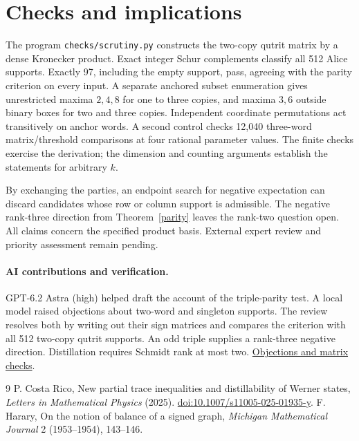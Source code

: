 \documentclass[11pt]{article}
\begin{document}
\section{Checks and implications}
The program \texttt{checks/scrutiny.py} constructs the two-copy qutrit matrix by a dense Kronecker product. Exact integer Schur complements classify all 512 Alice supports. Exactly 97, including the empty support, pass, agreeing with the parity criterion on every input. A separate anchored subset enumeration gives unrestricted maxima $2,4,8$ for one to three copies, and maxima $3,6$ outside binary boxes for two and three copies. Independent coordinate permutations act transitively on anchor words. A second control checks 12,040 three-word matrix/threshold comparisons at four rational parameter values. The finite checks exercise the derivation; the dimension and counting arguments establish the statements for arbitrary $k$.

By exchanging the parties, an endpoint search for negative expectation can discard candidates whose row or column support is admissible. The negative rank-three direction from Theorem~\ref{parity} leaves the rank-two question open. All claims concern the specified product basis. External expert review and priority assessment remain pending.
\paragraph{AI contributions and verification.} GPT-6.2 Astra (high) helped draft the account of the triple-parity test. A local model raised objections about two-word and singleton supports. The review resolves both by writing out their sign matrices and compares the criterion with all 512 two-copy qutrit supports. An odd triple supplies a rank-three negative direction. Distillation requires Schmidt rank at most two. \href{https://github.com/shunyaekam/oo-research/blob/a5cde30636afbfe599efab6bf8bbbafe9c640c22/checks/referee-audit.md}{Objections and matrix checks}.

\begin{thebibliography}{9}
 P. Costa Rico, New partial trace inequalities and distillability of Werner states, \emph{Letters in Mathematical Physics} (2025). \href{https://doi.org/10.1007/s11005-025-01935-y}{doi:10.1007/s11005-025-01935-y}.
 F. Harary, On the notion of balance of a signed graph, \emph{Michigan Mathematical Journal} 2 (1953--1954), 143--146.
\end{thebibliography}
\end{document}
